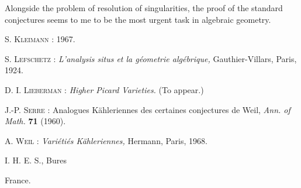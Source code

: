 Alongside the problem of resolution of singularities, the proof of the standard conjectures seems to me to be the most urgent task in algebraic geometry.

\begin{thebibliography}{99}
 \textsc{S. Kleimann :} 1967.

 \textsc{S. Lefschetz :} {\em L'analysis situs et la g\'eometrie alg\'ebrique,} Gauthier-Villars, Paris, 1924.

 \textsc{D. I. Lieberman :} {\em Higher Picard Varieties.} (To appear.)

 \textsc{J.-P. Serre :} Analogues K\"ahleriennes des certaines conjectures de Weil, {\em Ann. of Math.} {\bf 71} (1960).

 \textsc{A. Weil :} {\em Vari\'eti\'es K\"ahleriennes,} Hermann, Paris, 1968.
\end{thebibliography}

\bigskip

\noindent
{\small I. H. E. S., Bures}

\noindent
{\small France.}
